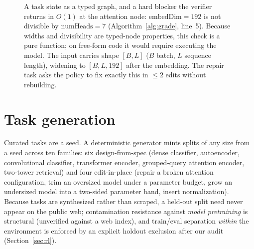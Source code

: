 \documentclass{article}
\begin{document}
\begin{figure}[t]
\centering
{}
\caption{A task state as a typed graph, and a hard blocker the verifier returns in $O(1)$ at the attention node: $\text{embedDim}{=}192$ is not divisible by $\text{numHeads}{=}7$ (Algorithm~\ref{alg:grade}, line~5). Because widths and divisibility are typed-node properties, this check is a pure function; on free-form code it would require executing the model. The input carries shape $[B,L]$ ($B$ batch, $L$ sequence length), widening to $[B,L,192]$ after the embedding. The repair task asks the policy to fix exactly this in $\le 2$ edits without rebuilding.}
\label{fig:typedgraph}
\end{figure}

\section{Task generation}
Curated tasks are a seed. A deterministic generator mints splits of any size from a seed across ten families: six design-from-spec (dense classifier, autoencoder, convolutional classifier, transformer encoder, grouped-query attention encoder, two-tower retrieval) and four edit-in-place (repair a broken attention configuration, trim an oversized model under a parameter budget, grow an undersized model into a two-sided parameter band, insert normalization). Because tasks are synthesized rather than scraped, a held-out split need never appear on the public web; contamination resistance against \emph{model pretraining} is structural (unverified against a web index), and train/eval separation \emph{within} the environment is enforced by an explicit holdout exclusion after our audit (Section~\ref{sec:rl}).
\end{document}
